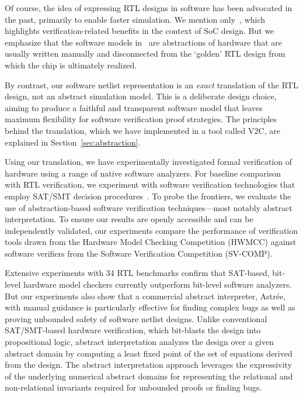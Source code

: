 Of course, the idea of expressing RTL designs in software has been
advocated in the past, primarily to enable faster simulation.  We mention
only~\cite{soc-keating}, which highlights verification-related benefits in
the context of SoC design.  But we emphasize that the software models
in~\cite{soc-keating} are abstractions of hardware that are usually written
manually and disconnected from the `golden' RTL design from which the chip
is ultimately realized.

By contrast, our software netlist representation is an \emph{exact}
translation of the RTL design, not an abstract simulation model.  This is a
deliberate design choice, aiming to produce a faithful and transparent
software model that leaves maximum flexibility for software verification
proof strategies.  The principles behind the translation, which we have
implemented in a tool called \textsc{V2C}, are explained in
Section~\ref{sec:abstraction}.

Using our translation, we have experimentally investigated formal
verification of hardware using a range of native software analyzers.  For
baseline comparison with RTL verification, we experiment with software
verification technologies that employ SAT/SMT decision
procedures~\cite{DBLP:conf/cav/BeyerK11, 2ls, cbmc.tacas:2004,
DBLP:conf/tacas/HeizmannDGLMSP16}.  To probe the frontiers, we evaluate the
use of abstraction-based software verification techniques---most notably
abstract interpretation.  To ensure our results are openly accessible and
can be independently validated, our experiments compare the performance of
verification tools drawn from the Hardware Model Checking Competition
(HWMCC) against software verifiers from the Software Verification
Competition (SV-COMP).

Extensive experiments with 34 RTL benchmarks confirm that SAT-based,
bit-level hardware model checkers currently outperform bit-level software
analyzers.  But our experiments also show that a commercial abstract
interpreter, Astr{\'e}e, with manual guidance is particularly effective for
finding complex bugs as well as proving unbounded safety of software netlist
designs.  Unlike conventional SAT/SMT-based hardware verification, which
bit-blasts the design into propositional logic, abstract interpretation
analyzes the design over a given abstract domain by computing a least fixed
point of the set of equations derived from the design.  The abstract
interpretation approach leverages the expressivity of the underlying
numerical abstract domains for representing the relational and
non-relational invariants required for unbounded proofs or finding bugs.

